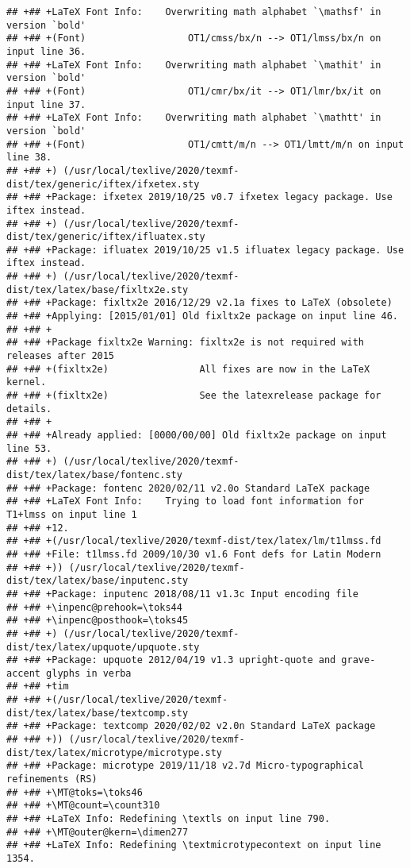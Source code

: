 \documentclass[ignorenonframetext,]{beamer}
\begin{document}
\begin{verbatim}
## +## +LaTeX Font Info:    Overwriting math alphabet `\mathsf' in version `bold'
## +## +(Font)                  OT1/cmss/bx/n --> OT1/lmss/bx/n on input line 36.
## +## +LaTeX Font Info:    Overwriting math alphabet `\mathit' in version `bold'
## +## +(Font)                  OT1/cmr/bx/it --> OT1/lmr/bx/it on input line 37.
## +## +LaTeX Font Info:    Overwriting math alphabet `\mathtt' in version `bold'
## +## +(Font)                  OT1/cmtt/m/n --> OT1/lmtt/m/n on input line 38.
## +## +) (/usr/local/texlive/2020/texmf-dist/tex/generic/iftex/ifxetex.sty
## +## +Package: ifxetex 2019/10/25 v0.7 ifxetex legacy package. Use iftex instead.
## +## +) (/usr/local/texlive/2020/texmf-dist/tex/generic/iftex/ifluatex.sty
## +## +Package: ifluatex 2019/10/25 v1.5 ifluatex legacy package. Use iftex instead.
## +## +) (/usr/local/texlive/2020/texmf-dist/tex/latex/base/fixltx2e.sty
## +## +Package: fixltx2e 2016/12/29 v2.1a fixes to LaTeX (obsolete)
## +## +Applying: [2015/01/01] Old fixltx2e package on input line 46.
## +## +
## +## +Package fixltx2e Warning: fixltx2e is not required with releases after 2015
## +## +(fixltx2e)                All fixes are now in the LaTeX kernel.
## +## +(fixltx2e)                See the latexrelease package for details.
## +## +
## +## +Already applied: [0000/00/00] Old fixltx2e package on input line 53.
## +## +) (/usr/local/texlive/2020/texmf-dist/tex/latex/base/fontenc.sty
## +## +Package: fontenc 2020/02/11 v2.0o Standard LaTeX package
## +## +LaTeX Font Info:    Trying to load font information for T1+lmss on input line 1
## +## +12.
## +## +(/usr/local/texlive/2020/texmf-dist/tex/latex/lm/t1lmss.fd
## +## +File: t1lmss.fd 2009/10/30 v1.6 Font defs for Latin Modern
## +## +)) (/usr/local/texlive/2020/texmf-dist/tex/latex/base/inputenc.sty
## +## +Package: inputenc 2018/08/11 v1.3c Input encoding file
## +## +\inpenc@prehook=\toks44
## +## +\inpenc@posthook=\toks45
## +## +) (/usr/local/texlive/2020/texmf-dist/tex/latex/upquote/upquote.sty
## +## +Package: upquote 2012/04/19 v1.3 upright-quote and grave-accent glyphs in verba
## +## +tim
## +## +(/usr/local/texlive/2020/texmf-dist/tex/latex/base/textcomp.sty
## +## +Package: textcomp 2020/02/02 v2.0n Standard LaTeX package
## +## +)) (/usr/local/texlive/2020/texmf-dist/tex/latex/microtype/microtype.sty
## +## +Package: microtype 2019/11/18 v2.7d Micro-typographical refinements (RS)
## +## +\MT@toks=\toks46
## +## +\MT@count=\count310
## +## +LaTeX Info: Redefining \textls on input line 790.
## +## +\MT@outer@kern=\dimen277
## +## +LaTeX Info: Redefining \textmicrotypecontext on input line 1354.

\end{verbatim}
\end{document}
